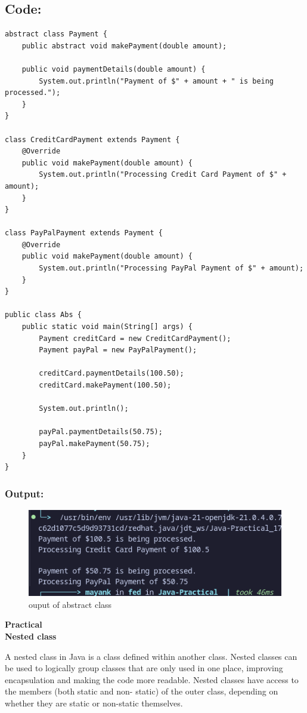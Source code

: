 \documentclass[a4paper,12pt]{article}
\newcounter{practicalno} %
\newcommand{\practicaltitle}[1]{
    \stepcounter{practicalno} %
    \newpage
    \begin{center}
        \vspace{1cm}
        \Large\textbf{Practical \thepracticalno} \\
        \vspace{0.5cm}
        \Large\textbf{#1} %
        \normalsize\vspace{1cm}
    \end{center}
}
\begin{document}
\subsection{Code: }
\begin{lstlisting}
abstract class Payment {
    public abstract void makePayment(double amount);

    public void paymentDetails(double amount) {
        System.out.println("Payment of $" + amount + " is being processed.");
    }
}

class CreditCardPayment extends Payment {
    @Override
    public void makePayment(double amount) {
        System.out.println("Processing Credit Card Payment of $" + amount);
    }
}

class PayPalPayment extends Payment {
    @Override
    public void makePayment(double amount) {
        System.out.println("Processing PayPal Payment of $" + amount);
    }
}

public class Abs {
    public static void main(String[] args) {
        Payment creditCard = new CreditCardPayment();
        Payment payPal = new PayPalPayment();
    
        creditCard.paymentDetails(100.50);
        creditCard.makePayment(100.50);   
    
        System.out.println(); 
    
        payPal.paymentDetails(50.75);  
        payPal.makePayment(50.75);     
    }
}
\end{lstlisting}
\subsubsection{Output: }
\begin{figure}[H]
    \centering
    \includegraphics[width=0.9\linewidth]{images/AbsOut.png}
    \caption{ouput of abstract class}
    \label{fig:sample_image}
\end{figure}

\setcounter{section}{0}

\practicaltitle{Nested class}
A nested class in Java is a class defined within another class. Nested classes can be
used to logically group classes that are only used in one place, improving
encapsulation and making the code more readable. Nested classes have access to the
members (both static and non- static) of the outer class, depending on whether they are
static or non-static themselves.
\end{document}
